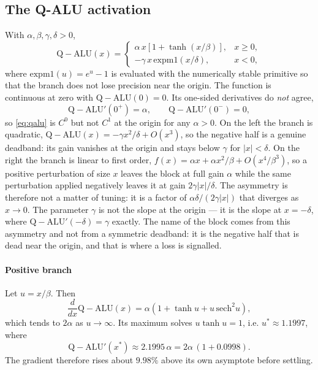 \documentclass[conference]{IEEEtran}
\newcommand{\QALU}{\mathrm{Q-ALU}}
\begin{document}
\subsection{The Q-ALU activation}
With $\alpha,\beta,\gamma,\delta>0$,
\begin{equation}
\QALU(x)=
\begin{cases}
\alpha\,x\left[1+\tanh\!\left(x/\beta\right)\right], & x\ge 0,\\[1mm]
-\gamma\,x\,\mathrm{expm1}\!\left(x/\delta\right), & x<0,
\end{cases}
\label{eq:qalu}
\end{equation}
where $\mathrm{expm1}(u)=e^{u}-1$ is evaluated with the numerically stable
primitive so that the branch does not lose precision near the origin. The
function is continuous at zero with $\QALU(0)=0$. Its one-sided derivatives do
\emph{not} agree,
\begin{equation}
\QALU'(0^+)=\alpha,\qquad \QALU'(0^-)=0,
\label{eq:kink}
\end{equation}
so \eqref{eq:qalu} is $C^0$ but not $C^1$ at the origin for any $\alpha>0$. On
the left the branch is quadratic, $\QALU(x)=-\gamma x^2/\delta+O(x^3)$, so the
negative half is a genuine deadband: its gain vanishes at the origin and stays
below $\gamma$ for $|x|<\delta$. On the right the branch is linear to first
order, $f(x)=\alpha x+\alpha x^{2}/\beta+O(x^{4}/\beta^{3})$, so a positive perturbation of size $x$
leaves the block at full gain $\alpha$ while the same perturbation applied
negatively leaves it at gain $2\gamma|x|/\delta$. The asymmetry is therefore not
a matter of tuning: it is a factor of $\alpha\delta/(2\gamma|x|)$ that diverges
as $x\to0$. The parameter $\gamma$ is not the slope at the origin --- it is the
slope at $x=-\delta$, where $\QALU'(-\delta)=\gamma$ exactly. The name of the
block comes from this asymmetry and not from a symmetric deadband: it is the
negative half that is dead near the origin, and that is where a loss is
signalled.

\paragraph{Positive branch}
Let $u=x/\beta$. Then
\begin{equation}
\frac{d}{dx}\QALU(x)=\alpha\left(1+\tanh u+u\,\mathrm{sech}^2u\right),
\end{equation}
which tends to $2\alpha$ as $u\to\infty$. Its maximum solves
$u\tanh u=1$, i.e. $u^\ast\approx1.1997$, where
\begin{equation}
\QALU'(x^\ast)\approx 2.1995\,\alpha = 2\alpha\,(1+0.0998).
\label{eq:pospeak}
\end{equation}
The gradient therefore rises about $9.98\%$ above its own asymptote before
settling.
\end{document}
